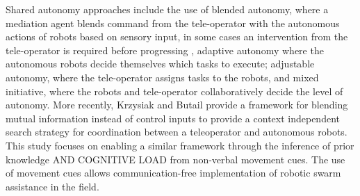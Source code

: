 \documentclass{article}
\begin{document}
Shared autonomy approaches include the use of blended autonomy, where a mediation agent blends command from the tele-operator with the autonomous actions of robots based on sensory input, in some cases an intervention from the tele-operator is required before progressing \cite{wegner2006agent}, adaptive autonomy \cite{hardin2009using} where the autonomous robots decide themselves which tasks to execute; adjustable autonomy, where the tele-operator assigns tasks to the robots, and mixed initiative, where the robots and tele-operator collaboratively decide the level of autonomy.  More recently, Krzysiak and Butail \cite{krzysiak2021information} provide a framework for blending mutual information instead of control inputs to provide a context independent search strategy for coordination between a teleoperator and autonomous robots. This study focuses on enabling a similar framework through the inference of prior knowledge AND COGNITIVE LOAD from non-verbal movement cues. The use of movement cues allows communication-free implementation of robotic swarm assistance in the field. 



\end{document}
